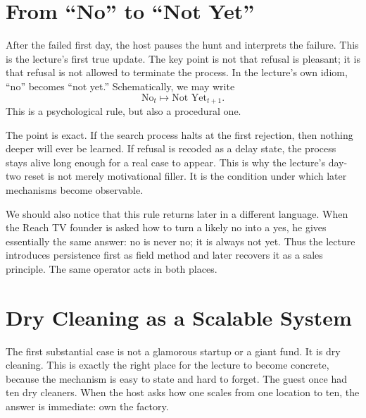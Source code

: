 \section{From ``No'' to ``Not Yet''}

After the failed first day, the host pauses the hunt and interprets the failure. This is the lecture's first true update. The key point is not that refusal is pleasant; it is that refusal is not allowed to terminate the process. In the lecture's own idiom, ``no'' becomes ``not yet.'' Schematically, we may write
\begin{equation}
\text{No}_t \longmapsto \text{Not Yet}_{t+1}.
\end{equation}
This is a psychological rule, but also a procedural one.

\begin{figure}[h]
\centering
{}
\end{figure}

The point is exact. If the search process halts at the first rejection, then nothing deeper will ever be learned. If refusal is recoded as a delay state, the process stays alive long enough for a real case to appear. This is why the lecture's day-two reset is not merely motivational filler. It is the condition under which later mechanisms become observable.

We should also notice that this rule returns later in a different language. When the Reach TV founder is asked how to turn a likely no into a yes, he gives essentially the same answer: no is never no; it is always not yet. Thus the lecture introduces persistence first as field method and later recovers it as a sales principle. The same operator acts in both places.

\section{Dry Cleaning as a Scalable System}

The first substantial case is not a glamorous startup or a giant fund. It is dry cleaning. This is exactly the right place for the lecture to become concrete, because the mechanism is easy to state and hard to forget. The guest once had ten dry cleaners. When the host asks how one scales from one location to ten, the answer is immediate: own the factory.

